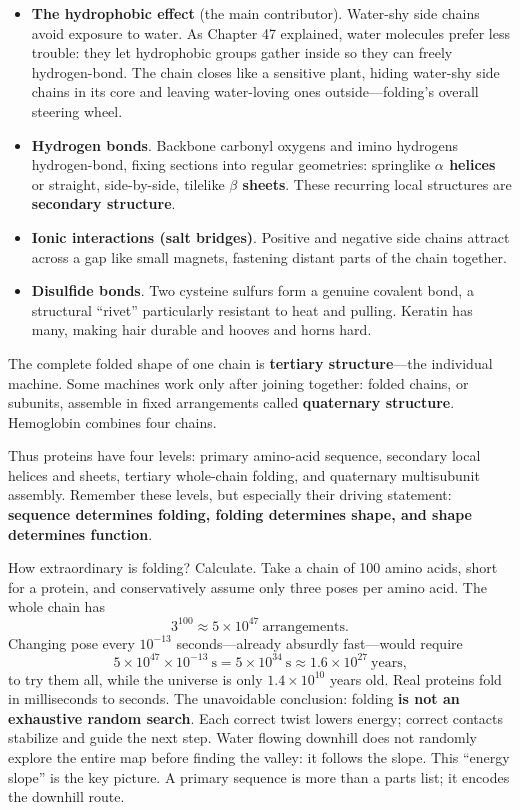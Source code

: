 \begin{itemize}[itemsep=2pt]
\item \textbf{The hydrophobic effect} (the main contributor). Water-shy side chains avoid exposure to water. As Chapter 47 explained, water molecules prefer less trouble: they let hydrophobic groups gather inside so they can freely hydrogen-bond. The chain closes like a sensitive plant, hiding water-shy side chains in its core and leaving water-loving ones outside---folding's overall steering wheel.
\item \textbf{Hydrogen bonds}. Backbone carbonyl oxygens and imino hydrogens hydrogen-bond, fixing sections into regular geometries: springlike \textbf{$\alpha$ helices} or straight, side-by-side, tilelike \textbf{$\beta$ sheets}. These recurring local structures are \textbf{secondary structure}.
\item \textbf{Ionic interactions (salt bridges)}. Positive and negative side chains attract across a gap like small magnets, fastening distant parts of the chain together.
\item \textbf{Disulfide bonds}. Two cysteine sulfurs form a genuine covalent bond, a structural ``rivet'' particularly resistant to heat and pulling. Keratin has many, making hair durable and hooves and horns hard.
\end{itemize}

The complete folded shape of one chain is \textbf{tertiary structure}---the individual machine. Some machines work only after joining together: folded chains, or subunits, assemble in fixed arrangements called \textbf{quaternary structure}. Hemoglobin combines four chains.

Thus proteins have four levels: primary amino-acid sequence, secondary local helices and sheets, tertiary whole-chain folding, and quaternary multisubunit assembly. Remember these levels, but especially their driving statement: \textbf{sequence determines folding, folding determines shape, and shape determines function}.

\begin{qiaoliang}
How extraordinary is folding? Calculate. Take a chain of 100 amino acids, short for a protein, and conservatively assume only three poses per amino acid. The whole chain has
\[3^{100} \approx 5\times 10^{47}\ \text{arrangements.}\]
Changing pose every $10^{-13}$ seconds---already absurdly fast---would require
\[5\times 10^{47}\times 10^{-13}\ \mathrm{s}=5\times 10^{34}\ \mathrm{s}\approx 1.6\times 10^{27}\ \text{years,}\]
to try them all, while the universe is only $1.4\times 10^{10}$ years old. Real proteins fold in milliseconds to seconds. The unavoidable conclusion: folding \textbf{is not an exhaustive random search}. Each correct twist lowers energy; correct contacts stabilize and guide the next step. Water flowing downhill does not randomly explore the entire map before finding the valley: it follows the slope. This ``energy slope'' is the key picture. A primary sequence is more than a parts list; it encodes the downhill route.
\end{qiaoliang}

